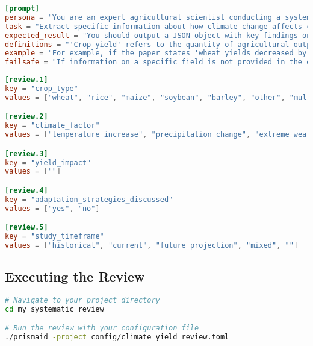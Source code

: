 \begin{configbox}
\begin{lstlisting}[language=TOML]
[prompt]
persona = "You are an expert agricultural scientist conducting a systematic review on climate change impacts."
task = "Extract specific information about how climate change affects crop yields from the scientific paper text provided."
expected_result = "You should output a JSON object with key findings on crop types, climate factors, and measured impacts."
definitions = "'Crop yield' refers to the quantity of agricultural output harvested per unit of land area."
example = "For example, if the paper states 'wheat yields decreased by 5.2% per degree Celsius increase', report 'wheat' as crop_type, 'temperature increase' as climate_factor, and '-5.2% per °C' as yield_impact."
failsafe = "If information on a specific field is not provided in the document, respond with an empty string value."
\end{lstlisting}
\end{configbox}

\begin{configbox}
\begin{lstlisting}[language=TOML]
[review.1]
key = "crop_type"
values = ["wheat", "rice", "maize", "soybean", "barley", "other", "multiple", ""]

[review.2]
key = "climate_factor"
values = ["temperature increase", "precipitation change", "extreme weather", "CO2 levels", "multiple factors", "other", ""]

[review.3]
key = "yield_impact"
values = [""]

[review.4]
key = "adaptation_strategies_discussed"
values = ["yes", "no"]

[review.5]
key = "study_timeframe"
values = ["historical", "current", "future projection", "mixed", ""]
\end{lstlisting}
\end{configbox}

\subsection{Executing the Review}
\begin{commandbox}
\begin{lstlisting}[language=Bash]
# Navigate to your project directory
cd my_systematic_review

# Run the review with your configuration file
./prismaid -project config/climate_yield_review.toml
\end{lstlisting}
\end{commandbox}

